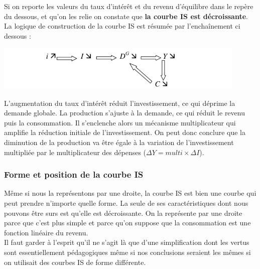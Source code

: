 \documentclass[10pt]{book}
\begin{document}
Si on reporte les valeurs du taux d'intérêt et du revenu d'équilibre dans le repère du dessous, et qu'on les relie on constate que \textbf{la courbe IS est décroissante}. La logique de construction de la courbe IS est résumée par l'enchaînement ci dessous :
\begin{center}
  \includegraphics[width=12cm]{graph22.png}
\end{center}
L'augmentation du taux d'intérêt réduit l'investissement, ce qui déprime la demande globale. La production s'ajuste à la demande, ce qui réduit le revenu puis la consommation. Il s'enclenche alors un mécanisme multiplicateur qui amplifie la réduction initiale de l'investissement. On peut donc conclure que la diminution de la production va être égale à la variation de l'investissement multipliée par le multiplicateur des dépenses ($\Delta Y = multi \times \Delta I$).
\subsubsection{Forme et position de la courbe IS}
Même si nous la représentons par une droite, la courbe IS est bien une courbe qui peut prendre n'importe quelle forme. La seule de ses caractéristiques dont nous pouvons être surs est qu'elle est décroissante. On la représente par une droite parce que c'est plus simple et parce qu'on suppose que la consommation est une fonction linéaire du revenu. \\
Il faut garder à l'esprit qu'il ne s'agit là que d'une simplification dont les vertus sont essentiellement pédagogiques même si nos conclusions seraient les mêmes si on utilisait des courbes IS de forme différente.
\end{document}

